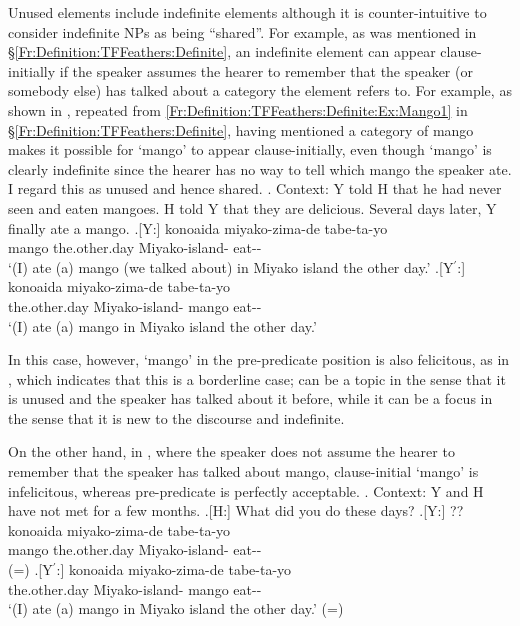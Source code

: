 Unused elements include indefinite elements
although it is counter-intuitive to consider indefinite NPs as being ``shared''.
For example, as was mentioned in \S \ref{Fr:Definition:TFFeathers:Definite},
an indefinite element can appear clause-initially
if the speaker assumes the hearer to remember that the speaker (or somebody else) has talked about a category the element refers to.
For example, as shown in \Next[Y],
repeated from \ref{Fr:Definition:TFFeathers:Definite:Ex:Mango1} in \S \ref{Fr:Definition:TFFeathers:Definite},
having mentioned a category of mango makes it possible for  `mango' to appear clause-initially,
even though
 `mango' is clearly indefinite
since the hearer has no way to tell which mango the speaker ate.
I regard this as unused and hence shared.
%
\ex. Context:
	Y told H that he had never seen and eaten mangoes.
	H told Y that they are delicious.
	Several days later, Y finally ate a mango.
	\ag.[Y:]  konoaida miyako-zima-de tabe-ta-yo \\
			mango the.other.day Miyako-island- eat-- \\
			`(I) ate (a) mango (we talked about) in Miyako island the other day.'
	\bg.[Y$^{\prime}$:] konoaida miyako-zima-de  tabe-ta-yo \\
			the.other.day Miyako-island- mango eat-- \\
			`(I) ate (a) mango in Miyako island the other day.'

In this case, however,
 `mango' in the pre-predicate position is also felicitous,
as in \Last[Y$^{\prime}$],
which indicates that this is a borderline case;
 can be a topic in the sense that
it is unused and the speaker has talked about it before,
while it can be a focus in the sense that
it is new to the discourse and indefinite.

On the other hand, in \Next[Y],
where the speaker does not assume the hearer to remember that
the speaker has talked about mango,
clause-initial  `mango' is infelicitous,
whereas pre-predicate  is perfectly acceptable.
%
\ex. Context:
	Y and H have not met for a few months.
	\a.[H:] What did you do these days?
	\bg.[Y:] ?? konoaida miyako-zima-de tabe-ta-yo \\
			mango the.other.day Miyako-island- eat-- \\
		\hfill(=\LLast[Y])
	\bg.[Y$^{\prime}$:] konoaida miyako-zima-de  tabe-ta-yo \\
			the.other.day Miyako-island- mango eat-- \\
			`(I) ate (a) mango in Miyako island the other day.'
		\hfill(=\LLast[Y$^{\prime}$])

